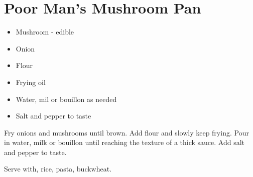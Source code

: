 \section{ Poor Man's Mushroom Pan}{
  \begin{itemize}

    \item Mushroom - edible
    \item Onion
    \item Flour
    \item Frying oil
    \item Water, mil or bouillon as needed
    \item Salt and pepper to taste

  \end{itemize}
  \vspace{.25in}

  Fry onions and mushrooms until brown. Add flour and
  slowly keep frying.
  Pour in water, milk or bouillon until reaching the texture of a thick sauce.
  Add salt and pepper to taste.

  Serve with, rice, pasta, buckwheat.

}
